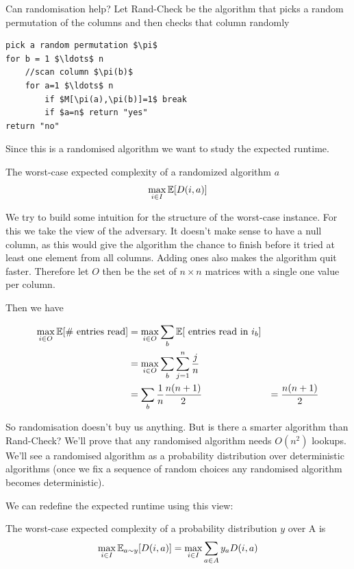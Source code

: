 Can randomisation help? Let {\sc Rand-Check} be the algorithm that picks a random permutation of the columns and then checks that column randomly

\begin{lstlisting}
pick a random permutation $\pi$
for b = 1 $\ldots$ n
	//scan column $\pi(b)$
	for a=1 $\ldots$ n
		if $M[\pi(a),\pi(b)]=1$ break
		if $a=n$ return "yes"
return "no"
\end{lstlisting}

Since this is a randomised algorithm we want to study the expected runtime. 

\begin{Def} The worst-case expected complexity of a randomized algorithm $a$
\[\max_{i\in I} \mathbb{E}[D(i,a)]\]
\end{Def}

We try to build some intuition for the structure of the worst-case instance. For this we take the view of the adversary.
It doesn't make sense to have a null column, as this would give the algorithm the chance to finish before it tried at least one element from all columns. Adding ones also makes the algorithm quit faster. Therefore let $O$ then be the set of $n\times n$ matrices with a single one value per column.

Then we have

\begin{align*}
\max_{i\in O} \mathbb{E}[\text{\# entries read}] &= \max_{i\in O} \sum_b \mathbb{E}[\text{ entries read in } i_b]\\
	&=\max_{i\in O}\sum_b \sum_{j=1}^n \frac jn\\
	&=\sum_b \frac 1n \frac{n(n+1)}{2} 
	&=\frac{n(n+1)}{2}
\end{align*}

So randomisation doesn't buy us anything. But is there a smarter algorithm than {\sc Rand-Check}? We'll prove that any randomised algorithm needs $O(n^2)$ lookups. We'll see a randomised algorithm as a probability distribution over deterministic algorithms (once we fix a sequence of random choices any randomised algorithm becomes deterministic).

We can redefine the expected runtime using this view:

\begin{Def} The worst-case expected complexity of a probability distribution $y$ over A is
\[\max_{i\in I} \mathbb{E}_{a\sim y}[D(i,a)] = \max_{i\in I} \sum_{a\in A} y_a D(i,a)\]
\end{Def}

